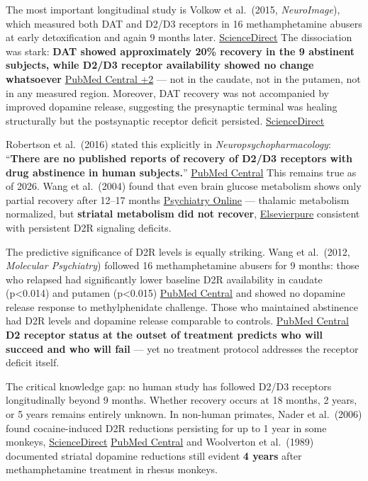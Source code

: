 The most important longitudinal study is Volkow et al.~(2015, \emph{NeuroImage}), which measured both DAT and D2/D3 receptors in 16 methamphetamine abusers at early detoxification and again 9 months later. \href{https://www.sciencedirect.com/science/article/abs/pii/S1053811915006461}{ScienceDirect} The dissociation was stark: \textbf{DAT showed approximately 20\% recovery in the 9 abstinent subjects, while D2/D3 receptor availability showed no change whatsoever} \href{https://pmc.ncbi.nlm.nih.gov/articles/PMC3261322/}{PubMed Central +2} --- not in the caudate, not in the putamen, not in any measured region. Moreover, DAT recovery was not accompanied by improved dopamine release, suggesting the presynaptic terminal was healing structurally but the postsynaptic receptor deficit persisted. \href{https://www.sciencedirect.com/science/article/abs/pii/S1053811915006461}{ScienceDirect}

Robertson et al.~(2016) stated this explicitly in \emph{Neuropsychopharmacology}: ``\textbf{There are no published reports of recovery of D2/D3 receptors with drug abstinence in human subjects.}'' \href{https://pmc.ncbi.nlm.nih.gov/articles/PMC4832026/}{PubMed Central} This remains true as of 2026. Wang et al.~(2004) found that even brain glucose metabolism shows only partial recovery after 12--17 months \href{https://psychiatryonline.org/doi/10.1176/appi.ajp.161.2.242}{Psychiatry Online} --- thalamic metabolism normalized, but \textbf{striatal metabolism did not recover}, \href{https://ohsu.elsevierpure.com/en/publications/partial-recovery-of-brain-metabolism-in-methamphetamine-abusers-a-2/}{Elsevierpure} consistent with persistent D2R signaling deficits.

The predictive significance of D2R levels is equally striking. Wang et al.~(2012, \emph{Molecular Psychiatry}) followed 16 methamphetamine abusers for 9 months: those who relapsed had significantly lower baseline D2R availability in caudate (p\textless0.014) and putamen (p\textless0.015) \href{https://pmc.ncbi.nlm.nih.gov/articles/PMC3261322/}{PubMed Central} and showed no dopamine release response to methylphenidate challenge. Those who maintained abstinence had D2R levels and dopamine release comparable to controls. \href{https://pmc.ncbi.nlm.nih.gov/articles/PMC3261322/}{PubMed Central} \textbf{D2 receptor status at the outset of treatment predicts who will succeed and who will fail} --- yet no treatment protocol addresses the receptor deficit itself.

The critical knowledge gap: no human study has followed D2/D3 receptors longitudinally beyond 9 months. Whether recovery occurs at 18 months, 2 years, or 5 years remains entirely unknown. In non-human primates, Nader et al.~(2006) found cocaine-induced D2R reductions persisting for up to 1 year in some monkeys, \href{https://www.sciencedirect.com/science/article/abs/pii/S0028390813003006}{ScienceDirect} \href{https://pmc.ncbi.nlm.nih.gov/articles/PMC4832026/}{PubMed Central} and Woolverton et al.~(1989) documented striatal dopamine reductions still evident \textbf{4 years} after methamphetamine treatment in rhesus monkeys.

